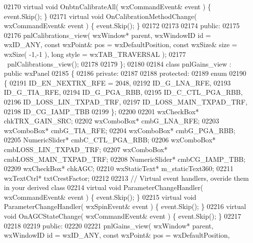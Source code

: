 \begin{DoxyCode}
02170         \textcolor{keyword}{virtual} \textcolor{keywordtype}{void} OnbtnCalibrateAll( wxCommandEvent& event ) \{ \textcolor{keyword}{event}.Skip(); \}
02171         \textcolor{keyword}{virtual} \textcolor{keywordtype}{void} OnCalibrationMethodChange( wxCommandEvent& event ) \{ \textcolor{keyword}{event}.Skip(); \}
02172         
02173     
02174     \textcolor{keyword}{public}:
02175         
02176         pnlCalibrations_view( wxWindow* parent, wxWindowID \textcolor{keywordtype}{id} = wxID\_ANY, \textcolor{keyword}{const} wxPoint& pos = 
      wxDefaultPosition, \textcolor{keyword}{const} wxSize& size = wxSize( -1,-1 ), \textcolor{keywordtype}{long} style = wxTAB\_TRAVERSAL ); 
02177         ~pnlCalibrations_view();
02178     
02179 \};
02180 
02184 \textcolor{keyword}{class }pnlGains_view : \textcolor{keyword}{public} wxPanel 
02185 \{
02186     \textcolor{keyword}{private}:
02187     
02188     \textcolor{keyword}{protected}:
02189         \textcolor{keyword}{enum}
02190         \{
02191             ID\_EN\_NEXTRX\_RFE = 2048,
02192             ID_G_LNA_RFE,
02193             ID_G_TIA_RFE,
02194             ID_G_PGA_RBB,
02195             ID_C_CTL_PGA_RBB,
02196             ID_LOSS_LIN_TXPAD_TRF,
02197             ID_LOSS_MAIN_TXPAD_TRF,
02198             ID\_CG\_IAMP\_TBB
02199         \};
02200         
02201         wxCheckBox* chkTRX_GAIN_SRC;
02202         wxComboBox* cmbG_LNA_RFE;
02203         wxComboBox* cmbG_TIA_RFE;
02204         wxComboBox* cmbG_PGA_RBB;
02205         NumericSlider* cmbC_CTL_PGA_RBB;
02206         wxComboBox* cmbLOSS_LIN_TXPAD_TRF;
02207         wxComboBox* cmbLOSS_MAIN_TXPAD_TRF;
02208         NumericSlider* cmbCG_IAMP_TBB;
02209         wxCheckBox* chkAGC;
02210         wxStaticText* m_staticText360;
02211         wxTextCtrl* txtCrestFactor;
02212         
02213         \textcolor{comment}{// Virtual event handlers, overide them in your derived class}
02214         \textcolor{keyword}{virtual} \textcolor{keywordtype}{void} ParameterChangeHandler( wxCommandEvent& event ) \{ \textcolor{keyword}{event}.Skip(); \}
02215         \textcolor{keyword}{virtual} \textcolor{keywordtype}{void} ParameterChangeHandler( wxSpinEvent& event ) \{ \textcolor{keyword}{event}.Skip(); \}
02216         \textcolor{keyword}{virtual} \textcolor{keywordtype}{void} OnAGCStateChange( wxCommandEvent& event ) \{ \textcolor{keyword}{event}.Skip(); \}
02217         
02218     
02219     \textcolor{keyword}{public}:
02220         
02221         pnlGains_view( wxWindow* parent, wxWindowID \textcolor{keywordtype}{id} = wxID\_ANY, \textcolor{keyword}{const} wxPoint& pos = wxDefaultPosition, \textcolor{keyword}{
}
\end{DoxyCode}
